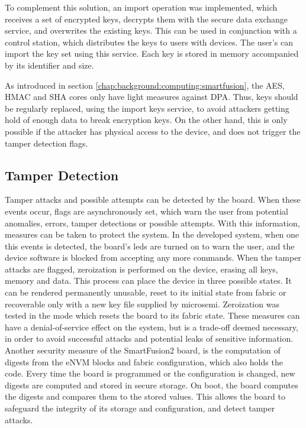 To complement this solution, an import operation was implemented, which receives a set of encrypted keys, decrypts them with the secure data exchange service, and overwrites the existing keys. This can be used in conjunction with a control station, which distributes the keys to users with devices. The user's can import the key set using this service.
Each key is stored in memory accompanied by its identifier and size.

As introduced in section \ref{chap:background:computing:smartfusion}, the AES, HMAC and SHA cores only have light measures against DPA. Thus, keys should be regularly replaced, using the import keys service, to avoid attackers getting hold of enough data to break encryption keys. On the other hand, this is only possible if the attacker has physical access to the device, and does not trigger the tamper detection flags. 

\subsection{Tamper Detection}\label{chap:implementation:services:tamper-detection}

Tamper attacks and possible attempts can be detected by the board. When these events occur, flags are asynchronously set, which warn the user from potential anomalies, errors, tamper detections or possible attempts. With this information, measures can be taken to protect the system.
In the developed system, when one this events is detected, the board's leds are turned on to warn the user, and the device software is blocked from accepting any more commands.
When the tamper attacks are flagged, zeroization is performed on the device, erasing all keys, memory and data.
This process can place the device in three possible states. It can be rendered permanently unusable, reset to its initial state from fabric or recoverable only with a new key file supplied by microsemi. Zeroization was tested in the mode which resets the board to its fabric state.
These measures can have a denial-of-service effect on the system, but is a trade-off deemed necessary, in order to avoid successful attacks and potential leaks of sensitive information.
Another security measure of the SmartFusion2 board, is the computation of digests from the eNVM blocks and fabric configuration, which also holds the code. Every time the board is programmed or the configuration is changed, new digests are computed and stored in secure storage. On boot, the board computes the digests and compares them to the stored values. This allows the board to safeguard the integrity of its storage and configuration, and detect tamper attacks.

